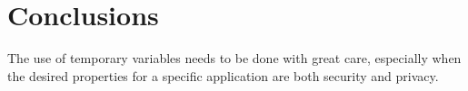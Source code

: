 \chapter*{Conclusions} 

The use of temporary variables needs to be done with great care, especially when the desired 
properties for a specific application are both security and privacy. 